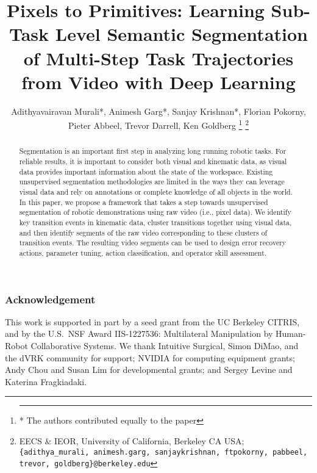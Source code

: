 \documentclass[letterpaper, 10 pt, conference]{ieeeconf}
\title{\LARGE \bf
Pixels to Primitives: Learning Sub-Task Level Semantic Segmentation \\
of Multi-Step Task Trajectories from Video with Deep Learning }
\author{%
Adithyavairavan Murali*, Animesh Garg*, Sanjay Krishnan*, Florian Pokorny,\\ 
Pieter Abbeel, Trevor Darrell, Ken Goldberg \quad {\textcolor{blue}{[v0.1, \today\,\currenttime]}}
\thanks{\hrule \vspace{5pt} * The authors contributed equally to the paper}%
\thanks{EECS \& IEOR, University of California, Berkeley CA USA; \texttt{\{adithya\_murali, animesh.garg, sanjaykrishnan, ftpokorny, pabbeel, trevor, goldberg\}@berkeley.edu}}%
}
\begin{document}
\maketitle

\begin{abstract}
Segmentation is an important first step in analyzing long running robotic tasks. For reliable results, it is important to consider both visual and kinematic data, as visual data provides important information about the state of the workspace. 
Existing unsupervised segmentation methodologies are limited in the ways they can leverage visual data and rely on annotations or complete knowledge of all objects in the world. In this paper, we propose a framework that takes a step towards unsupervised segmentation of robotic demonstrations using raw video (i.e., pixel data). 
We identify key transition events in kinematic data, cluster transitions together using visual data, and then identify segments of the raw video corresponding to these clusters of transition events. 
The resulting video segments can be used to design error recovery actions, parameter tuning, action classification, 
and operator skill assessment. 
\end{abstract} 










\subsubsection*{Acknowledgement}
This work is supported in part by a seed grant from the UC Berkeley CITRIS, and by the U.S.\ NSF Award IIS-1227536: Multilateral Manipulation by Human-Robot Collaborative Systems. We thank Intuitive Surgical, Simon DiMao, and the dVRK community for support; NVIDIA for computing equipment grants; Andy Chou and Susan Lim for developmental grants; and Sergey Levine and Katerina Fragkiadaki.




\end{document}
